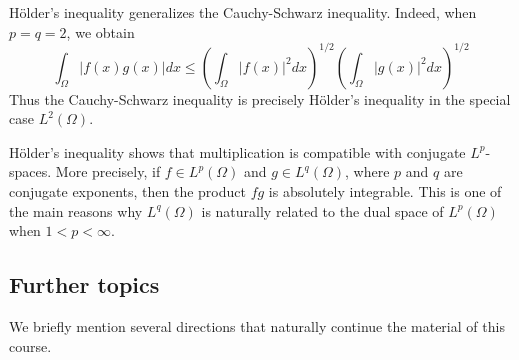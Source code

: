 \begin{remark}
Hölder's inequality generalizes the Cauchy-Schwarz inequality. Indeed, when $p = q = 2$, we obtain
\[ \int_{\Omega} |f(x)g(x)| dx \le \left(\int_{\Omega} |f(x)|^{2} dx\right)^{1/2} \left(\int_{\Omega} |g(x)|^{2} dx\right)^{1/2} \]
Thus the Cauchy-Schwarz inequality is precisely Hölder's inequality in the special case $L^{2}(\Omega)$.
\end{remark}

\begin{remark}
Hölder's inequality shows that multiplication is compatible with conjugate $L^p$-spaces. More precisely, if $f \in L^{p}(\Omega)$ and $g \in L^{q}(\Omega)$, where $p$ and $q$ are conjugate exponents, then the product $fg$ is absolutely integrable. This is one of the main reasons why $L^{q}(\Omega)$ is naturally related to the dual space of $L^{p}(\Omega)$ when $1 < p < \infty$.
\end{remark}

\subsection*{Further topics}

We briefly mention several directions that naturally continue the material of this course.

